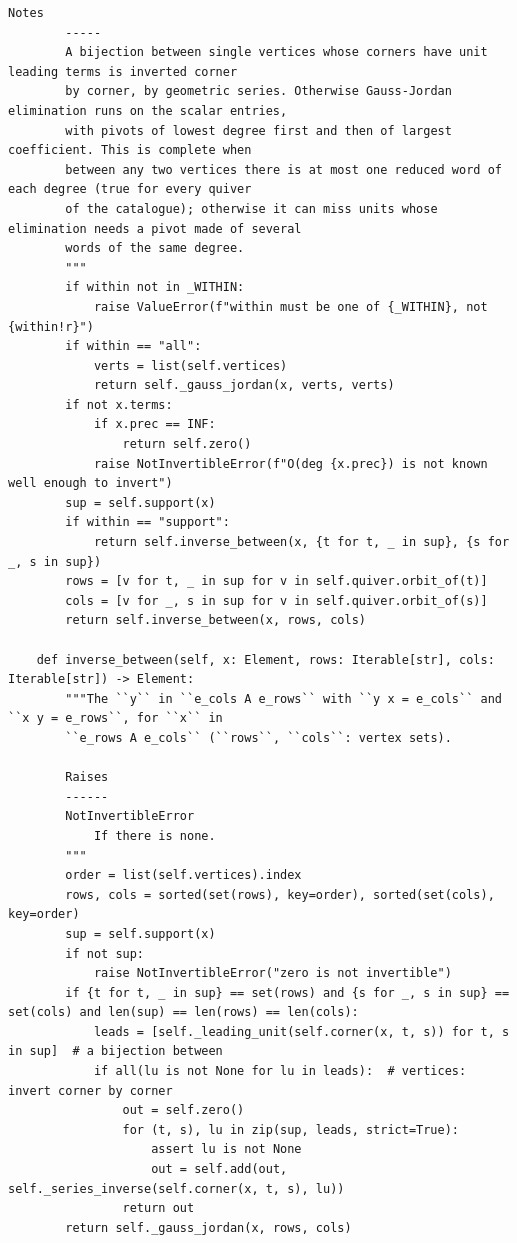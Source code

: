\documentclass[12pt, a4paper]{report}
\theoremstyle{plain}
\theoremstyle{definition}
\theoremstyle{remark}
\theoremstyle{plain}
\begin{document}
\begin{lstlisting}[style=dsqcode]
        Notes
        -----
        A bijection between single vertices whose corners have unit leading terms is inverted corner
        by corner, by geometric series. Otherwise Gauss-Jordan elimination runs on the scalar entries,
        with pivots of lowest degree first and then of largest coefficient. This is complete when
        between any two vertices there is at most one reduced word of each degree (true for every quiver
        of the catalogue); otherwise it can miss units whose elimination needs a pivot made of several
        words of the same degree.
        """
        if within not in _WITHIN:
            raise ValueError(f"within must be one of {_WITHIN}, not {within!r}")
        if within == "all":
            verts = list(self.vertices)
            return self._gauss_jordan(x, verts, verts)
        if not x.terms:
            if x.prec == INF:
                return self.zero()
            raise NotInvertibleError(f"O(deg {x.prec}) is not known well enough to invert")
        sup = self.support(x)
        if within == "support":
            return self.inverse_between(x, {t for t, _ in sup}, {s for _, s in sup})
        rows = [v for t, _ in sup for v in self.quiver.orbit_of(t)]
        cols = [v for _, s in sup for v in self.quiver.orbit_of(s)]
        return self.inverse_between(x, rows, cols)

    def inverse_between(self, x: Element, rows: Iterable[str], cols: Iterable[str]) -> Element:
        """The ``y`` in ``e_cols A e_rows`` with ``y x = e_cols`` and ``x y = e_rows``, for ``x`` in
        ``e_rows A e_cols`` (``rows``, ``cols``: vertex sets).

        Raises
        ------
        NotInvertibleError
            If there is none.
        """
        order = list(self.vertices).index
        rows, cols = sorted(set(rows), key=order), sorted(set(cols), key=order)
        sup = self.support(x)
        if not sup:
            raise NotInvertibleError("zero is not invertible")
        if {t for t, _ in sup} == set(rows) and {s for _, s in sup} == set(cols) and len(sup) == len(rows) == len(cols):
            leads = [self._leading_unit(self.corner(x, t, s)) for t, s in sup]  # a bijection between
            if all(lu is not None for lu in leads):  # vertices: invert corner by corner
                out = self.zero()
                for (t, s), lu in zip(sup, leads, strict=True):
                    assert lu is not None
                    out = self.add(out, self._series_inverse(self.corner(x, t, s), lu))
                return out
        return self._gauss_jordan(x, rows, cols)


\end{lstlisting}
\end{document}

